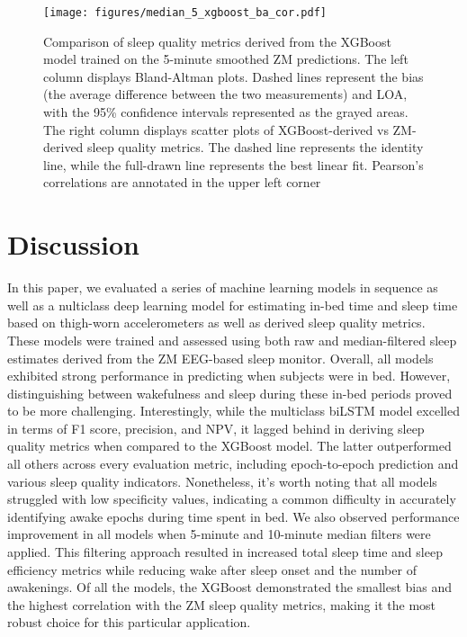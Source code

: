 \documentclass[
  10pt,
]{scrbook}
\begin{document}
\begin{figure}

{\centering \texttt{[image: figures/median\_5\_xgboost\_ba\_cor.pdf]}

}

\caption{\label{fig-xgb_ba_cor}Comparison of sleep quality metrics
derived from the XGBoost model trained on the 5-minute smoothed ZM
predictions. The left column displays Bland-Altman plots. Dashed lines
represent the bias (the average difference between the two measurements)
and LOA, with the 95\% confidence intervals represented as the grayed
areas. The right column displays scatter plots of XGBoost-derived vs
ZM-derived sleep quality metrics. The dashed line represents the
identity line, while the full-drawn line represents the best linear fit.
Pearson's correlations are annotated in the upper left corner}

\end{figure}

\hypertarget{discussion-2}{%
\section{Discussion}\label{discussion-2}}

In this paper, we evaluated a series of machine learning models in
sequence as well as a nulticlass deep learning model for estimating
in-bed time and sleep time based on thigh-worn accelerometers as well as
derived sleep quality metrics. These models were trained and assessed
using both raw and median-filtered sleep estimates derived from the ZM
EEG-based sleep monitor. Overall, all models exhibited strong
performance in predicting when subjects were in bed. However,
distinguishing between wakefulness and sleep during these in-bed periods
proved to be more challenging. Interestingly, while the multiclass
biLSTM model excelled in terms of F1 score, precision, and NPV, it
lagged behind in deriving sleep quality metrics when compared to the
XGBoost model. The latter outperformed all others across every
evaluation metric, including epoch-to-epoch prediction and various sleep
quality indicators. Nonetheless, it's worth noting that all models
struggled with low specificity values, indicating a common difficulty in
accurately identifying awake epochs during time spent in bed. We also
observed performance improvement in all models when 5-minute and
10-minute median filters were applied. This filtering approach resulted
in increased total sleep time and sleep efficiency metrics while
reducing wake after sleep onset and the number of awakenings. Of all the
models, the XGBoost demonstrated the smallest bias and the highest
correlation with the ZM sleep quality metrics, making it the most robust
choice for this particular application.
\end{document}

